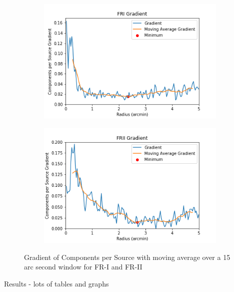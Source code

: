 \documentclass{article}
\begin{document}
\begin{figure}
    \centering
    \begin{subfigure}[b]{0.5\textwidth}
        \centering
        \includegraphics[width=1\linewidth]{fri_grad.png} 
        \caption{}
        \label{fig:subim1}
    \end{subfigure}%
    \begin{subfigure}[b]{0.5\textwidth}
        \centering
        \includegraphics[width=1\linewidth]{frii_grad.png}
        \caption{}
        \label{fig:subim2}
    \end{subfigure}
 
    \caption{Gradient of Components per Source with moving average over a 15 arc second window for FR-I and FR-II}
    \label{fig:image2}
\end{figure}




Results - lots of tables and graphs
\end{document}
